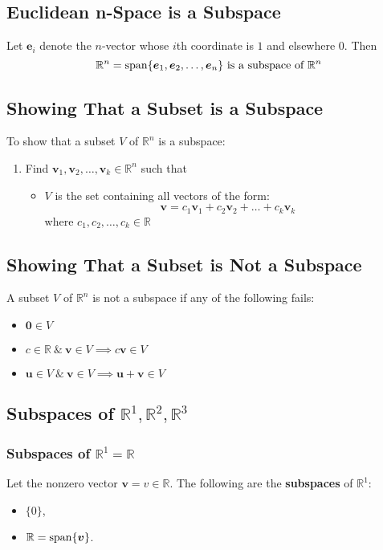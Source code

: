 \documentclass[../ma2001_notes.tex]{subfiles}
\begin{document}
\subsection{Euclidean n-Space is a Subspace}
Let \(\bm{e}_i\) denote the \(n\)-vector whose \(i\)th coordinate is \(1\) and elsewhere \(0\). Then
\[\mathbb{R}^n=\operatorname{span}\{\bm{e}_1,\bm{e}_2,\ldots,\bm{e}_n\}\text{ is a subspace of }\mathbb{R}^n\]

\subsection{Showing That a Subset is a Subspace}
To show that a subset \(V\) of \(\mathbb{R}^n\) is a subspace:
\begin{enumerate}
	\item Find \(\bm{v}_1,\bm{v}_2,\ldots,\bm{v}_k\in\mathbb{R}^n\) such that
	\begin{itemize}
		\item\(V\) is the set containing all vectors of the form:
		\[\bm{v}=c_1\bm{v}_1+c_2\bm{v}_2+\ldots+c_k\bm{v}_k\]
		where \(c_1,c_2,\ldots,c_k\in\mathbb{R}\)
	\end{itemize}
\end{enumerate}

\subsection{Showing That a Subset is Not a Subspace}
A subset \(V\) of \(\mathbb{R}^n\) is not a subspace if any of the following fails:
\begin{itemize}
	\item\(\bm{0}\in V\)
	\item\(c\in\mathbb{R}\ \&\ \bm{v}\in V\implies c\bm{v}\in V\)
	\item\(\bm{u}\in V\ \& \ \bm{v}\in V\implies\bm{u}+\bm{v}\in V\)
\end{itemize}

\subsection{Subspaces of $\mathbb{R}^1,\mathbb{R}^2,\mathbb{R}^3$}
\subsubsection{Subspaces of $\mathbb{R}^1=\mathbb{R}$}
Let the nonzero vector \(\bm{v}=v\in\mathbb{R}\). The following are the \textbf{subspaces} of \(\mathbb{R}^1\):
\begin{itemize}
	\item\(\{0\}\),
	\item\(\mathbb{R}=\operatorname{span}\{\bm{v}\}\).
\end{itemize}
\end{document}
